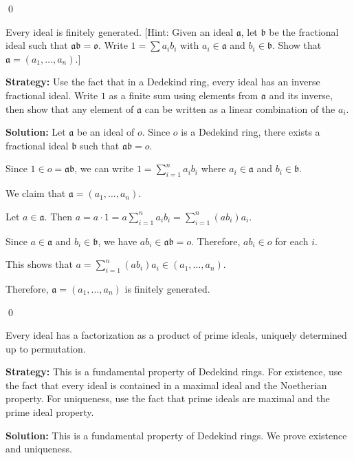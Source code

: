 \qed
\begin{problembox}
Every ideal is finitely generated. [Hint: Given an ideal $\mathfrak{a}$, let $\mathfrak{b}$ be the fractional ideal such that $\mathfrak{a}\mathfrak{b} = \mathfrak{o}$. Write $1 = \sum a_i b_i$ with $a_i \in \mathfrak{a}$ and $b_i \in \mathfrak{b}$. Show that $\mathfrak{a} = (a_1, \ldots, a_n)$.]
\end{problembox}

\noindent\textbf{Strategy:} Use the fact that in a Dedekind ring, every ideal has an inverse fractional ideal. Write $1$ as a finite sum using elements from $\mathfrak{a}$ and its inverse, then show that any element of $\mathfrak{a}$ can be written as a linear combination of the $a_i$.

\noindent\textbf{Solution:}
Let $\mathfrak{a}$ be an ideal of $o$. Since $o$ is a Dedekind ring, there exists a fractional ideal $\mathfrak{b}$ such that $\mathfrak{a}\mathfrak{b} = o$.

Since $1 \in o = \mathfrak{a}\mathfrak{b}$, we can write $1 = \sum_{i=1}^n a_i b_i$ where $a_i \in \mathfrak{a}$ and $b_i \in \mathfrak{b}$.

We claim that $\mathfrak{a} = (a_1, \ldots, a_n)$.

Let $a \in \mathfrak{a}$. Then $a = a \cdot 1 = a \sum_{i=1}^n a_i b_i = \sum_{i=1}^n (a b_i) a_i$.

Since $a \in \mathfrak{a}$ and $b_i \in \mathfrak{b}$, we have $a b_i \in \mathfrak{a}\mathfrak{b} = o$. Therefore, $a b_i \in o$ for each $i$.

This shows that $a = \sum_{i=1}^n (a b_i) a_i \in (a_1, \ldots, a_n)$.

Therefore, $\mathfrak{a} = (a_1, \ldots, a_n)$ is finitely generated.


\qed
\begin{problembox}
Every ideal has a factorization as a product of prime ideals, uniquely determined up to permutation.
\end{problembox}

\noindent\textbf{Strategy:} This is a fundamental property of Dedekind rings. For existence, use the fact that every ideal is contained in a maximal ideal and the Noetherian property. For uniqueness, use the fact that prime ideals are maximal and the prime ideal property.

\noindent\textbf{Solution:}
This is a fundamental property of Dedekind rings. We prove existence and uniqueness.

